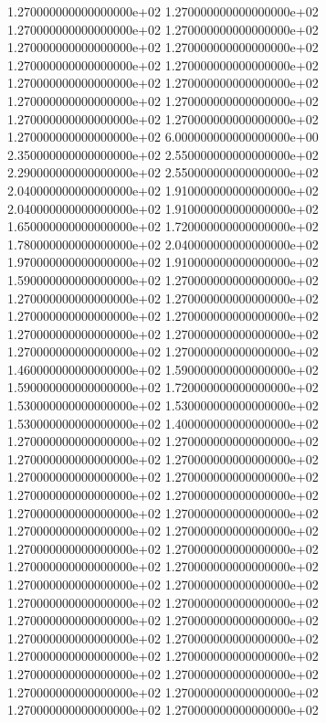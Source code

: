 1.270000000000000000e+02 1.270000000000000000e+02 1.270000000000000000e+02 1.270000000000000000e+02 1.270000000000000000e+02 1.270000000000000000e+02 1.270000000000000000e+02 1.270000000000000000e+02 1.270000000000000000e+02 1.270000000000000000e+02 1.270000000000000000e+02 1.270000000000000000e+02 1.270000000000000000e+02 1.270000000000000000e+02 1.270000000000000000e+02 6.000000000000000000e+00 2.350000000000000000e+02 2.550000000000000000e+02 2.290000000000000000e+02 2.550000000000000000e+02 2.040000000000000000e+02 1.910000000000000000e+02 2.040000000000000000e+02 1.910000000000000000e+02 1.650000000000000000e+02 1.720000000000000000e+02 1.780000000000000000e+02 2.040000000000000000e+02 1.970000000000000000e+02 1.910000000000000000e+02 1.590000000000000000e+02 1.270000000000000000e+02 1.270000000000000000e+02 1.270000000000000000e+02 1.270000000000000000e+02 1.270000000000000000e+02 1.270000000000000000e+02 1.270000000000000000e+02 1.270000000000000000e+02 1.270000000000000000e+02 1.460000000000000000e+02 1.590000000000000000e+02 1.590000000000000000e+02 1.720000000000000000e+02 1.530000000000000000e+02 1.530000000000000000e+02 1.530000000000000000e+02 1.400000000000000000e+02 1.270000000000000000e+02 1.270000000000000000e+02 1.270000000000000000e+02 1.270000000000000000e+02 1.270000000000000000e+02 1.270000000000000000e+02 1.270000000000000000e+02 1.270000000000000000e+02 1.270000000000000000e+02 1.270000000000000000e+02 1.270000000000000000e+02 1.270000000000000000e+02 1.270000000000000000e+02 1.270000000000000000e+02 1.270000000000000000e+02 1.270000000000000000e+02 1.270000000000000000e+02 1.270000000000000000e+02 1.270000000000000000e+02 1.270000000000000000e+02 1.270000000000000000e+02 1.270000000000000000e+02 1.270000000000000000e+02 1.270000000000000000e+02 1.270000000000000000e+02 1.270000000000000000e+02 1.270000000000000000e+02 1.270000000000000000e+02 1.270000000000000000e+02 1.270000000000000000e+02 1.270000000000000000e+02 1.270000000000000000e+02
